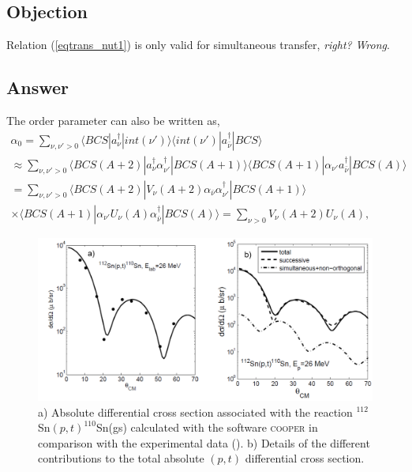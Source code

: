 \subsection*{Objection}
Relation (\ref{eqtrans_nut1}) is only valid for simultaneous transfer, \textit{right?} \textit{Wrong}.
\subsection*{Answer}
The order parameter can also be written as, 
\begin{multline}
\alpha_0=\sum_{\nu,\nu'>0}\langle BCS |a^\dagger_{\nu}|int(\nu')\rangle\langle int(\nu')|a^\dagger_{\bar\nu}|BCS\rangle\\
\approx\sum_{\nu,\nu'>0}\langle BCS (A+2) |a^\dagger_{\nu}\alpha^\dagger_{\nu'}|BCS (A+1)\rangle\langle BCS (A+1)|\alpha_{\nu'}a^\dagger_{\bar\nu}|BCS (A)\rangle \\
=\sum_{\nu,\nu'>0}\langle BCS(A+2) |V_\nu(A+2)\alpha_{\bar\nu}\alpha^\dagger_{\nu'}|BCS(A+1)\rangle\\
\times\langle BCS(A+1)|\alpha_{\nu'}U_\nu(A)\alpha^\dagger_{\bar\nu}|BCS(A)\rangle
=\sum_{\nu>0}V_\nu(A+2)U_{\nu}(A),
\end{multline}
\begin{figure}
\centerline{\includegraphics*[width=\textwidth,angle=0]{nutshell/figs/fig2A2.pdf}}
\caption{a) Absolute differential cross section associated with the reaction $^{112}$Sn$(p,t)^{110}$Sn(gs) calculated with the software \textsc{cooper} in comparison with the experimental data (\cite{Guazzoni:06}). b) Details of the different contributions to the total absolute $(p,t)$ differential cross section. 
}\label{fig_2A2}
\end{figure}
